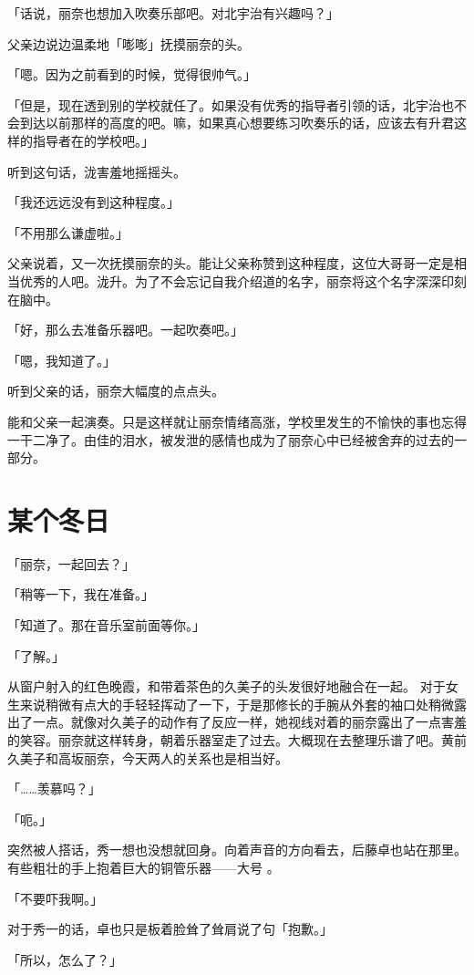 \documentclass[UTF8]{ctexart}
\begin{document}
    「话说，丽奈也想加入吹奏乐部吧。对北宇治有兴趣吗？」

    父亲边说边温柔地「嘭嘭」抚摸丽奈的头。

    「嗯。因为之前看到的时候，觉得很帅气。」

    「但是，现在透到别的学校就任了。如果没有优秀的指导者引领的话，北宇治也不会到达以前那样的高度的吧。嘛，如果真心想要练习吹奏乐的话，应该去有升君这样的指导者在的学校吧。」

    听到这句话，泷害羞地摇摇头。

    「我还远远没有到这种程度。」

    「不用那么谦虚啦。」

    父亲说着，又一次抚摸丽奈的头。能让父亲称赞到这种程度，这位大哥哥一定是相当优秀的人吧。泷升。为了不会忘记自我介绍道的名字，丽奈将这个名字深深印刻在脑中。

    「好，那么去准备乐器吧。一起吹奏吧。」

    「嗯，我知道了。」

    听到父亲的话，丽奈大幅度的点点头。

    能和父亲一起演奏。只是这样就让丽奈情绪高涨，学校里发生的不愉快的事也忘得一干二净了。由佳的泪水，被发泄的感情也成为了丽奈心中已经被舍弃的过去的一部分。
    \section{某个冬日}
    「丽奈，一起回去？」

    「稍等一下，我在准备。」

    「知道了。那在音乐室前面等你。」

    「了解。」

    从窗户射入的红色晚霞，和带着茶色的久美子的头发很好地融合在一起。 对于女生来说稍微有点大的手轻轻挥动了一下，于是那修长的手腕从外套的袖口处稍微露出了一点。就像对久美子的动作有了反应一样，她视线对着的丽奈露出了一点害羞的笑容。丽奈就这样转身，朝着乐器室走了过去。大概现在去整理乐谱了吧。黄前久美子和高坂丽奈，今天两人的关系也是相当好。

    「……羡慕吗？」

    「呃。」

    突然被人搭话，秀一想也没想就回身。向着声音的方向看去，后藤卓也站在那里。有些粗壮的手上抱着巨大的铜管乐器——大号 。

    「不要吓我啊。」

    对于秀一的话，卓也只是板着脸耸了耸肩说了句「抱歉。」

    「所以，怎么了？」
\end{document}
